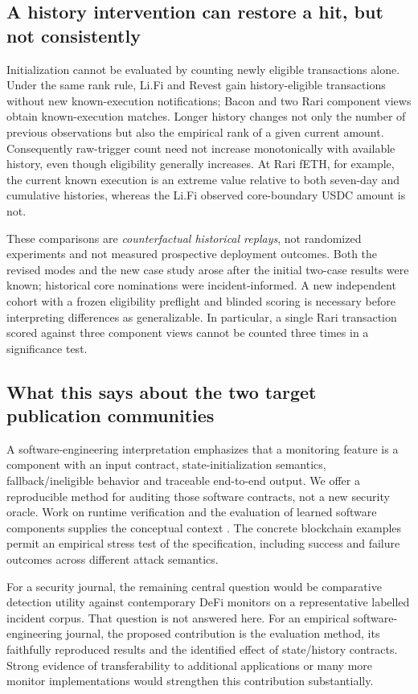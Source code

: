 \documentclass[preprint,12pt,authoryear]{elsarticle}
\begin{document}
\subsection{A history intervention can restore a hit, but not consistently}
Initialization cannot be evaluated by counting newly eligible transactions alone. Under the same rank rule, Li.Fi and Revest gain history-eligible transactions without new known-execution notifications; Bacon and two Rari component views obtain known-execution matches. Longer history changes not only the number of previous observations but also the empirical rank of a given current amount. Consequently raw-trigger count need not increase monotonically with available history, even though eligibility generally increases. At Rari fETH, for example, the current known execution is an extreme value relative to both seven-day and cumulative histories, whereas the Li.Fi observed core-boundary USDC amount is not.

These comparisons are \emph{counterfactual historical replays}, not randomized experiments and not measured prospective deployment outcomes. Both the revised modes and the new case study arose after the initial two-case results were known; historical core nominations were incident-informed. A new independent cohort with a frozen eligibility preflight and blinded scoring is necessary before interpreting differences as generalizable. In particular, a single Rari transaction scored against three component views cannot be counted three times in a significance test.

\subsection{What this says about the two target publication communities}
A software-engineering interpretation emphasizes that a monitoring feature is a component with an input contract, state-initialization semantics, fallback/ineligible behavior and traceable end-to-end output. We offer a reproducible method for auditing those software contracts, not a new security oracle. Work on runtime verification and the evaluation of learned software components supplies the conceptual context \citep{Leucker2009RV,Bauer2011RV,Arp2022Dons,Sculley2015Debt}. The concrete blockchain examples permit an empirical stress test of the specification, including success and failure outcomes across different attack semantics.

For a security journal, the remaining central question would be comparative detection utility against contemporary DeFi monitors on a representative labelled incident corpus. That question is not answered here. For an empirical software-engineering journal, the proposed contribution is the evaluation method, its faithfully reproduced results and the identified effect of state/history contracts. Strong evidence of transferability to additional applications or many more monitor implementations would strengthen this contribution substantially.
\end{document}
